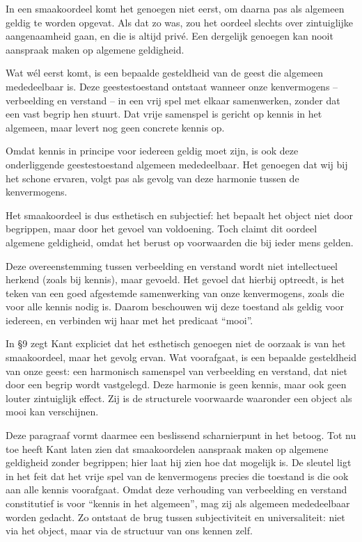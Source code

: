 \begin{mdframed}[leftmargin=0pt,rightmargin=0pt,backgroundcolor=blue!6,linecolor=white,innertopmargin=6pt,innerbottommargin=6pt]
In een smaakoordeel komt het genoegen niet eerst, om daarna pas als algemeen geldig te worden opgevat. Als dat zo was, zou het oordeel slechts over zintuiglijke aangenaamheid gaan, en die is altijd privé. Een dergelijk genoegen kan nooit aanspraak maken op algemene geldigheid.

Wat wél eerst komt, is een bepaalde gesteldheid van de geest die algemeen mededeelbaar is. Deze geestestoestand ontstaat wanneer onze kenvermogens – verbeelding en verstand – in een vrij spel met elkaar samenwerken, zonder dat een vast begrip hen stuurt. Dat vrije samenspel is gericht op kennis in het algemeen, maar levert nog geen concrete kennis op.

Omdat kennis in principe voor iedereen geldig moet zijn, is ook deze onderliggende geestestoestand algemeen mededeelbaar. Het genoegen dat wij bij het schone ervaren, volgt pas als gevolg van deze harmonie tussen de kenvermogens.

Het smaakoordeel is dus esthetisch en subjectief: het bepaalt het object niet door begrippen, maar door het gevoel van voldoening. Toch claimt dit oordeel algemene geldigheid, omdat het berust op voorwaarden die bij ieder mens gelden.

Deze overeenstemming tussen verbeelding en verstand wordt niet intellectueel herkend (zoals bij kennis), maar gevoeld. Het gevoel dat hierbij optreedt, is het teken van een goed afgestemde samenwerking van onze kenvermogens, zoals die voor alle kennis nodig is. Daarom beschouwen wij deze toestand als geldig voor iedereen, en verbinden wij haar met het predicaat “mooi”.

\bigskip
In §9 zegt Kant expliciet dat het esthetisch genoegen niet de oorzaak is van het smaakoordeel, maar het gevolg ervan. Wat voorafgaat, is een bepaalde gesteldheid van onze geest: een harmonisch samenspel van verbeelding en verstand, dat niet door een begrip wordt vastgelegd. Deze harmonie is geen kennis, maar ook geen louter zintuiglijk effect. Zij is de structurele voorwaarde waaronder een object als mooi kan verschijnen.

Deze paragraaf vormt daarmee een beslissend scharnierpunt in het betoog. Tot nu toe heeft Kant laten zien dat smaakoordelen aanspraak maken op algemene geldigheid zonder begrippen; hier laat hij zien hoe dat mogelijk is. De sleutel ligt in het feit dat het vrije spel van de kenvermogens precies die toestand is die ook aan alle kennis voorafgaat. Omdat deze verhouding van verbeelding en verstand constitutief is voor “kennis in het algemeen”, mag zij als algemeen mededeelbaar worden gedacht. Zo ontstaat de brug tussen subjectiviteit en universaliteit: niet via het object, maar via de structuur van ons kennen zelf.


\end{mdframed}
